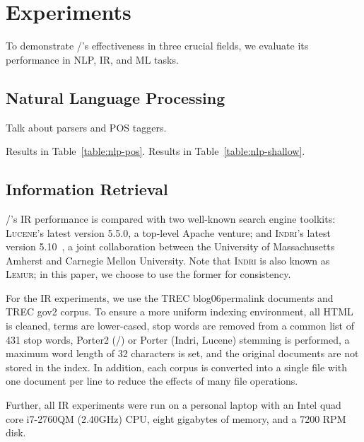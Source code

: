 \section{Experiments}
\label{sec:experiments}

To demonstrate \meta/'s effectiveness in three crucial fields, we evaluate its
performance in NLP, IR, and ML tasks.

\subsection{Natural Language Processing}

Talk about parsers and POS taggers.

Results in Table~\ref{table:nlp-pos}.
Results in Table~\ref{table:nlp-shallow}.





\subsection{Information Retrieval}

\meta/'s IR performance is compared with two well-known search engine toolkits:
\textsc{Lucene}'s latest version 5.5.0\footnotemark[12], a top-level Apache
venture; and \textsc{Indri}'s latest version 5.10~\cite{lemur}, a joint
collaboration between the University of Massachusetts Amherst and Carnegie
Mellon University. Note that \textsc{Indri} is also known as \textsc{Lemur}; in
this paper, we choose to use the former for consistency.


For the IR experiments, we use the TREC blog06\footnotemark[7] permalink
documents and TREC gov2 corpus\footnotemark[8].
To ensure a more uniform indexing environment, all HTML is cleaned, terms are
lower-cased, stop words are removed from a common list of 431 stop words,
Porter2 (\meta/) or Porter (Indri, Lucene) stemming is performed, a maximum word
length of 32 characters is set, and the original documents are not stored in the
index. In addition, each corpus is converted into a single file with one
document per line to reduce the effects of many file operations.


Further, all IR experiments were run on a personal laptop with an Intel quad
core i7-2760QM (2.40GHz) CPU, eight gigabytes of memory, and a 7200 RPM disk.


